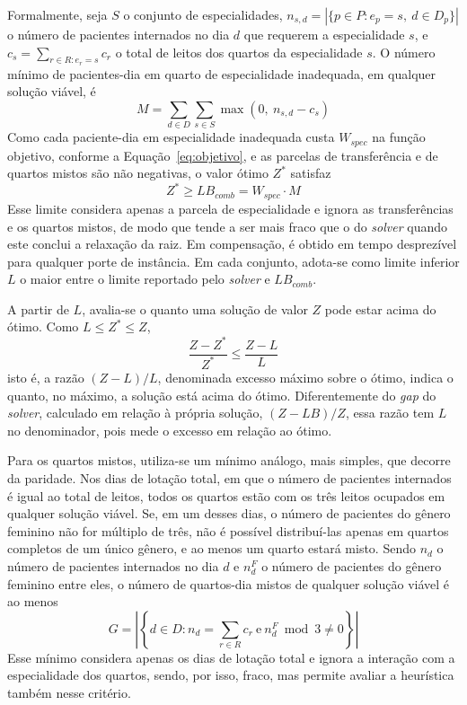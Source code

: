 \begin{itemize}
    Formalmente, seja $S$ o conjunto de especialidades, $n_{s,d} = |\{p \in P : e_p = s,\ d \in D_p\}|$ o número de pacientes internados no dia $d$ que requerem a especialidade $s$, e $c_s = \sum_{r \in R : e_r = s} c_r$ o total de leitos dos quartos da especialidade $s$. O número mínimo de pacientes-dia em quarto de especialidade inadequada, em qualquer solução viável, é
    \begin{equation}
        M = \sum_{d \in D} \sum_{s \in S} \max\left(0,\ n_{s,d} - c_s\right)
        \label{eq:minimo-especialidade}
    \end{equation}
    Como cada paciente-dia em especialidade inadequada custa $W_{spec}$ na função objetivo, conforme a Equação~\eqref{eq:objetivo}, e as parcelas de transferência e de quartos mistos são não negativas, o valor ótimo $Z^*$ satisfaz
    \begin{equation}
        Z^* \geq LB_{comb} = W_{spec} \cdot M
        \label{eq:limite-combinatorio}
    \end{equation}
    Esse limite considera apenas a parcela de especialidade e ignora as transferências e os quartos mistos, de modo que tende a ser mais fraco que o do \textit{solver} quando este conclui a relaxação da raiz. Em compensação, é obtido em tempo desprezível para qualquer porte de instância. Em cada conjunto, adota-se como limite inferior $L$ o maior entre o limite reportado pelo \textit{solver} e $LB_{comb}$.

    A partir de $L$, avalia-se o quanto uma solução de valor $Z$ pode estar acima do ótimo. Como $L \leq Z^* \leq Z$,
    \begin{equation}
        \frac{Z - Z^*}{Z^*} \leq \frac{Z - L}{L}
        \label{eq:excesso-otimo}
    \end{equation}
    isto é, a razão $(Z - L)/L$, denominada excesso máximo sobre o ótimo, indica o quanto, no máximo, a solução está acima do ótimo. Diferentemente do \textit{gap} do \textit{solver}, calculado em relação à própria solução, $(Z - LB)/Z$, essa razão tem $L$ no denominador, pois mede o excesso em relação ao ótimo.

    Para os quartos mistos, utiliza-se um mínimo análogo, mais simples, que decorre da paridade. Nos dias de lotação total, em que o número de pacientes internados é igual ao total de leitos, todos os quartos estão com os três leitos ocupados em qualquer solução viável. Se, em um desses dias, o número de pacientes do gênero feminino não for múltiplo de três, não é possível distribuí-las apenas em quartos completos de um único gênero, e ao menos um quarto estará misto. Sendo $n_d$ o número de pacientes internados no dia $d$ e $n^F_d$ o número de pacientes do gênero feminino entre eles, o número de quartos-dia mistos de qualquer solução viável é ao menos
    \begin{equation}
        G = \left|\left\{ d \in D : n_d = \sum_{r \in R} c_r \ \text{e} \ n^F_d \bmod 3 \neq 0 \right\}\right|
        \label{eq:minimo-misto}
    \end{equation}
    Esse mínimo considera apenas os dias de lotação total e ignora a interação com a especialidade dos quartos, sendo, por isso, fraco, mas permite avaliar a heurística também nesse critério.
    


\end{itemize}
